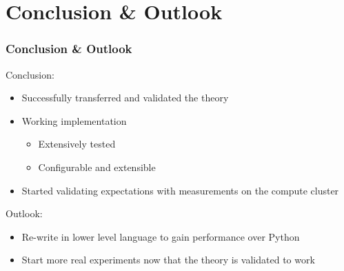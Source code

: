 \section{Conclusion \& Outlook}
    \begin{frame}[t]
        \frametitle{Conclusion \& Outlook}
        
        \begin{exampleblock}{Conclusion:}
            \begin{itemize}
                \item Successfully transferred and validated the theory
                \item Working implementation
                \begin{itemize}
                    \item Extensively tested
                    \item Configurable and extensible
                \end{itemize}
                \item Started validating expectations with measurements on the compute cluster
            \end{itemize}
        \end{exampleblock}
        
        \pause

        \begin{block}{Outlook:}
            \begin{itemize}
                \item Re-write in lower level language to gain performance over Python
                \item Start more real experiments now that the theory is validated to work
            \end{itemize}
        \end{block}

        \onslide %
    \end{frame}
